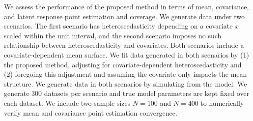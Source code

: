 \documentclass[useAMS,referee,usenatbib]{biom}
\begin{document}

\fi 
We assess the performance of the proposed method in terms of mean, covariance, and latent response point estimation and coverage. We generate data under two scenarios. The first scenario has heteroscedasticity depending on a covariate $x$ scaled within the unit interval, and the second scenario imposes no such relationship between heteroscedasticity and covariates. Both scenarios include a covariate-dependent mean surface. We fit data generated in both scenarios by (1) the proposed method, adjusting for covariate-dependent heteroscedasticity and (2) foregoing this adjustment and assuming the covariate only impacts the mean structure. We generate data in both scenarios by simulating from the model. We generate 300 datasets per scenario and true model parameters are kept fixed over each dataset. We include two sample sizes $N=100$ and $N=400$ to numerically verify mean and covariance point estimation convergence. 
\end{document}
